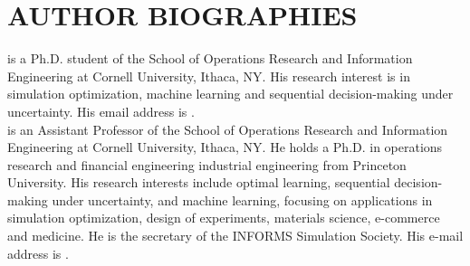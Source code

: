 \documentclass{wscpaperproc}
\theoremstyle{wsc}
\begin{document}



\section*{AUTHOR BIOGRAPHIES}

 is a Ph.D. student of the School of Operations Research and Information Engineering at Cornell University, Ithaca, NY. His research interest is in simulation optimization, machine learning and sequential decision-making under uncertainty. His email address is . \\

 is an Assistant Professor of the School of Operations Research and Information Engineering at Cornell University, Ithaca, NY.  He holds a Ph.D. in operations research and financial engineering industrial engineering from Princeton University. His research interests include optimal learning, sequential decision-making under uncertainty, and machine learning, focusing on applications in simulation optimization, design of experiments, materials science, e-commerce and medicine. He is the secretary of the INFORMS Simulation Society.
His e-mail address is .\\
\end{document}
